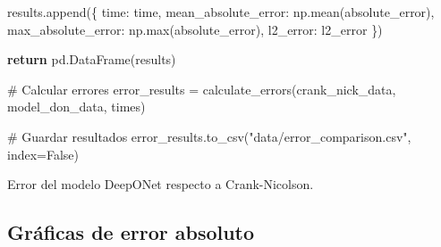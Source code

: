 \documentclass[
  spanish,
  us-letterpaper,
  DIV=11,
  numbers=noendperiod]{scrreprt}
\newenvironment{Shaded}{\begin{snugshade}}{\end{snugshade}}
\newcommand{\BuiltInTok}[1]{\textcolor[rgb]{0.00,0.23,0.31}{#1}}
\newcommand{\CommentTok}[1]{\textcolor[rgb]{0.37,0.37,0.37}{#1}}
\newcommand{\ControlFlowTok}[1]{\textcolor[rgb]{0.00,0.23,0.31}{\textbf{#1}}}
\newcommand{\NormalTok}[1]{\textcolor[rgb]{0.00,0.23,0.31}{#1}}
\newcommand{\OperatorTok}[1]{\textcolor[rgb]{0.37,0.37,0.37}{#1}}
\newcommand{\StringTok}[1]{\textcolor[rgb]{0.13,0.47,0.30}{#1}}
\newcommand{\VariableTok}[1]{\textcolor[rgb]{0.07,0.07,0.07}{#1}}
\theoremstyle{definition}
\theoremstyle{plain}
\theoremstyle{remark}
\begin{document}
\begin{Shaded}
\begin{Highlighting}[]
\NormalTok{        results.append(\{}
            \StringTok{\textquotesingle{}time\textquotesingle{}}\NormalTok{: time,}
            \StringTok{\textquotesingle{}mean\_absolute\_error\textquotesingle{}}\NormalTok{: np.mean(absolute\_error),}
            \StringTok{\textquotesingle{}max\_absolute\_error\textquotesingle{}}\NormalTok{: np.}\BuiltInTok{max}\NormalTok{(absolute\_error),}
            \StringTok{\textquotesingle{}l2\_error\textquotesingle{}}\NormalTok{: l2\_error}
\NormalTok{        \})}
    
    \ControlFlowTok{return}\NormalTok{ pd.DataFrame(results)}

\CommentTok{\# Calcular errores}
\NormalTok{error\_results }\OperatorTok{=}\NormalTok{ calculate\_errors(crank\_nick\_data, model\_don\_data, times)}

\CommentTok{\# Guardar resultados}
\NormalTok{error\_results.to\_csv(}\StringTok{"data/error\_comparison.csv"}\NormalTok{, index}\OperatorTok{=}\VariableTok{False}\NormalTok{)}
\end{Highlighting}
\end{Shaded}

\begin{table}

\caption{\label{tbl-errores}Error del modelo DeepONet respecto a
Crank-Nicolson.}


\end{table}%

\subsection{Gráficas de error
absoluto}\label{gruxe1ficas-de-error-absoluto}
\end{document}
